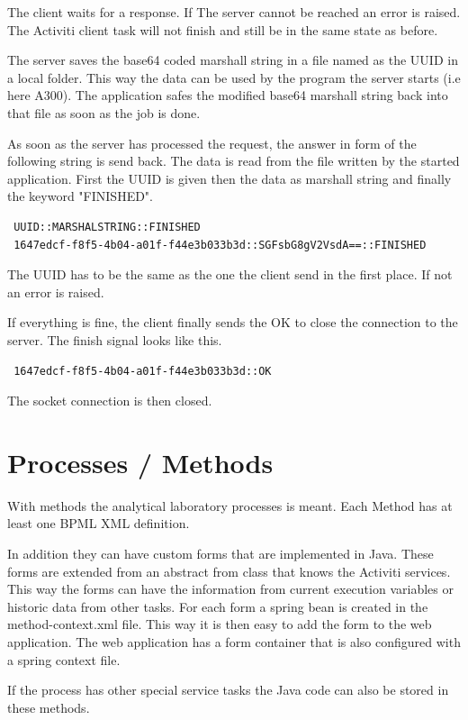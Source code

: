\documentclass[paper=a4,twoside=false,BCOR=0mm,DIV=calc,fontsize=12pt]{scrartcl}
\begin{document}
The client waits for a response. If The server cannot be reached an error is raised. 
The Activiti client task will not finish and still be in the same state as before.

The server saves the base64 coded marshall string in a file named as the UUID in a local folder.
This way the data can be used by the program the server starts (i.e here A300). 
The application safes the modified base64 marshall string back into that file as soon as the job is done.

As soon as the server has processed the request, the answer in form of the following string is send back.
The data is read from the file written by the started application.
First the UUID is given then the data as marshall string and finally the keyword "FINISHED".

\begin{verbatim}
 UUID::MARSHALSTRING::FINISHED
 1647edcf-f8f5-4b04-a01f-f44e3b033b3d::SGFsbG8gV2VsdA==::FINISHED
\end{verbatim}

The UUID has to be the same as the one the client send in the first place. If not an error is raised.

If everything is fine, the client finally sends the OK to close the connection to the server.
The finish signal looks like this.
\begin{verbatim}
 1647edcf-f8f5-4b04-a01f-f44e3b033b3d::OK
\end{verbatim}
The socket connection is then closed.

\section{Processes / Methods}
With methods the analytical laboratory processes is meant. Each Method has at least one BPML XML definition.

In addition they can have custom forms that are implemented in Java. These forms are extended from an abstract from class that knows the Activiti services. This way the forms can have the information from current execution variables or historic data from other tasks. For each form a spring bean is created in the method-context.xml file. This way it is then easy to add the form to the web application. The web application has a form container that is also configured with a spring context file.

If the process has other special service tasks the Java code can also be stored in these methods. 
\end{document}
